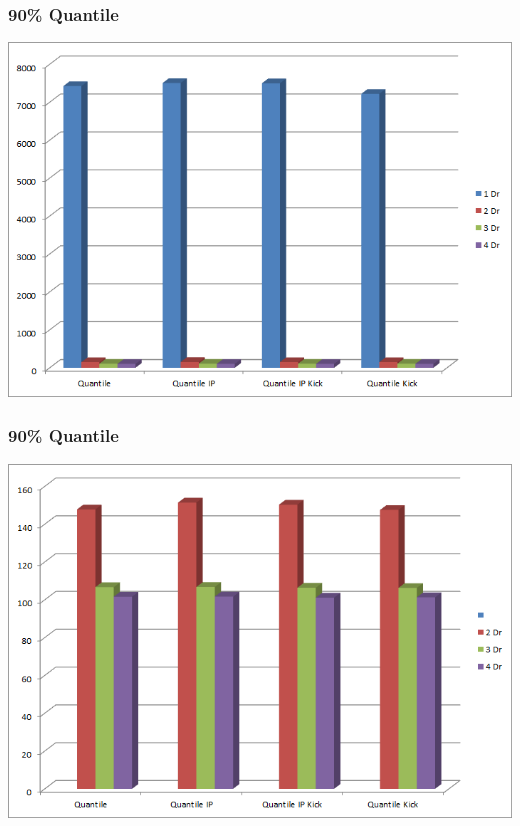 \documentclass{beamer}
\begin{document}


\begin{frame}
	\frametitle{90\% Quantile}
	\begin{center}
		\includegraphics[scale=0.6]{img/Quantile.png}
	\end{center}
\end{frame}

\begin{frame}
	\frametitle{90\% Quantile}
	\begin{center}
		\includegraphics[scale=0.6]{img/Quantile2.png}
	\end{center}
\end{frame}
\end{document}
